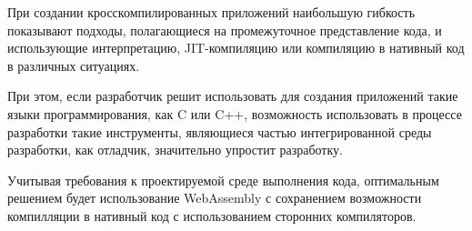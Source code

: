 При создании кросскомпилированных приложений наибольшую гибкость показывают подходы, полагающиеся на промежуточное представление кода, и использующие интерпретацию, JIT-компиляцию или компиляцию в нативный код в различных ситуациях.

При этом, если разработчик решит использовать для создания приложений такие языки программирования, как C или C++, возможность использовать в процессе разработки такие инструменты, являющиеся частью интегрированной среды разработки, как отладчик, значительно упростит разработку. 

Учитывая требования к проектируемой среде выполнения кода, оптимальным решением будет использование WebAssembly с сохранением возможности компилляции в нативный код с использованием сторонних компиляторов.

